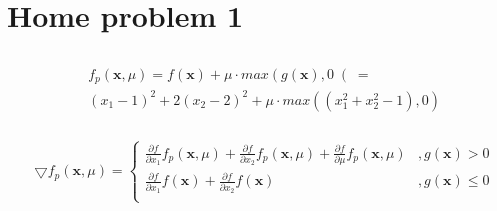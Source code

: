 \documentclass{article}
\begin{document}
\section{Home problem 1}
\subsection{}
\subsubsection{}

\begin{align*}
  &f_\mathit{p}(\mathbf{x}, \mu) = f(\mathbf{x}) + \mu \cdot max \left( g(\mathbf{x}), 0 \right(  = \\
  &(x_1 - 1)^2 + 2(x_2 - 2)^2 + \mu \cdot max \left( (x_1^2 + x_2^2 - 1 ), 0 \right)
\end{align*}

\subsubsection{}

\begin{align*}
  & \bigtriangledown f_\mathit{p}(\mathbf{x}, \mu) =
  \begin{cases}
    \frac{\partial f}{\partial x_1}f_\mathit{p}(\mathbf{x}, \mu) + \frac{\partial f}{\partial x_2}f_\mathit{p}(\mathbf{x}, \mu) + \frac{\partial f}{\partial \mu}f_\mathit{p}(\mathbf{x}, \mu) &,g(\mathbf{x}) > 0 \\
    \frac{\partial f}{\partial x_1}f(\mathbf{x}) + \frac{\partial f}{\partial x_2}f(\mathbf{x}) &, g(\mathbf{x}) \leq 0 \\
  \end{cases}
\end{align*}

\subsection{}

\subsection{}
\end{document}
